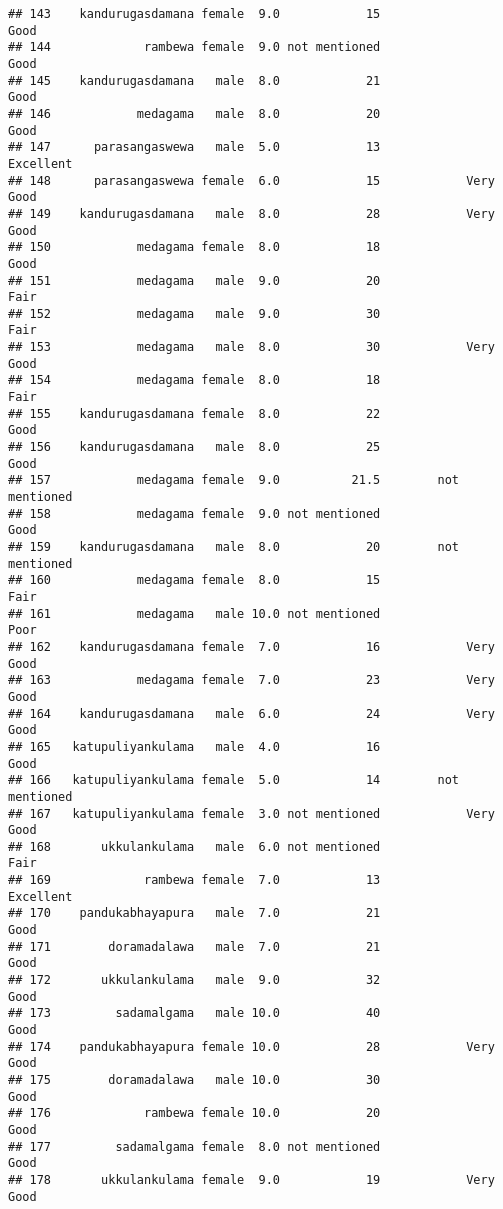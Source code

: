 \documentclass[
]{article}
\begin{document}
\begin{verbatim}
## 143    kandurugasdamana female  9.0            15                 Good
## 144             rambewa female  9.0 not mentioned                 Good
## 145    kandurugasdamana   male  8.0            21                 Good
## 146            medagama   male  8.0            20                 Good
## 147      parasangaswewa   male  5.0            13            Excellent
## 148      parasangaswewa female  6.0            15            Very Good
## 149    kandurugasdamana   male  8.0            28            Very Good
## 150            medagama female  8.0            18                 Good
## 151            medagama   male  9.0            20                 Fair
## 152            medagama   male  9.0            30                 Fair
## 153            medagama   male  8.0            30            Very Good
## 154            medagama female  8.0            18                 Fair
## 155    kandurugasdamana female  8.0            22                 Good
## 156    kandurugasdamana   male  8.0            25                 Good
## 157            medagama female  9.0          21.5        not mentioned
## 158            medagama female  9.0 not mentioned                 Good
## 159    kandurugasdamana   male  8.0            20        not mentioned
## 160            medagama female  8.0            15                 Fair
## 161            medagama   male 10.0 not mentioned                 Poor
## 162    kandurugasdamana female  7.0            16            Very Good
## 163            medagama female  7.0            23            Very Good
## 164    kandurugasdamana   male  6.0            24            Very Good
## 165   katupuliyankulama   male  4.0            16                 Good
## 166   katupuliyankulama female  5.0            14        not mentioned
## 167   katupuliyankulama female  3.0 not mentioned            Very Good
## 168       ukkulankulama   male  6.0 not mentioned                 Fair
## 169             rambewa female  7.0            13            Excellent
## 170    pandukabhayapura   male  7.0            21                 Good
## 171        doramadalawa   male  7.0            21                 Good
## 172       ukkulankulama   male  9.0            32                 Good
## 173         sadamalgama   male 10.0            40                 Good
## 174    pandukabhayapura female 10.0            28            Very Good
## 175        doramadalawa   male 10.0            30                 Good
## 176             rambewa female 10.0            20                 Good
## 177         sadamalgama female  8.0 not mentioned                 Good
## 178       ukkulankulama female  9.0            19            Very Good

\end{verbatim}
\end{document}
